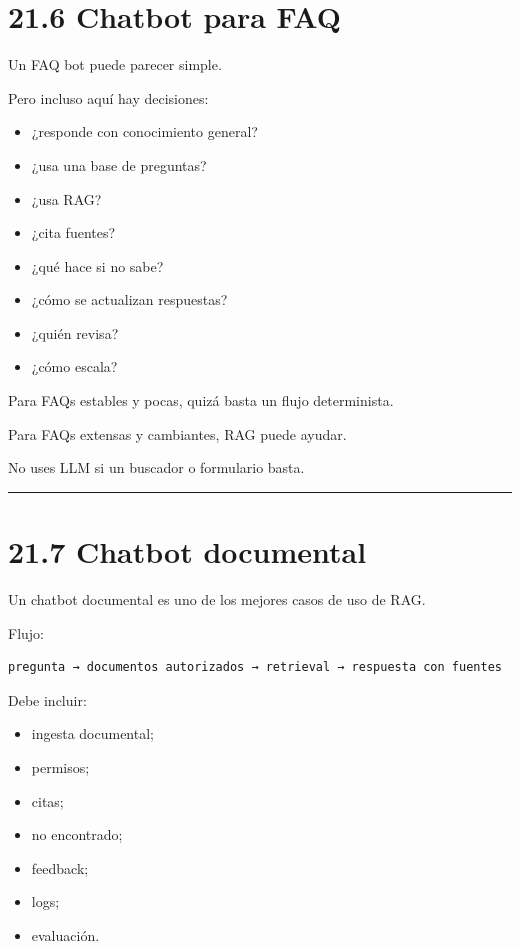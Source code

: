 \section{21.6 Chatbot para FAQ}\label{chatbot-para-faq}

Un FAQ bot puede parecer simple.

Pero incluso aquí hay decisiones:

\begin{itemize}
\tightlist
\item
  ¿responde con conocimiento general?
\item
  ¿usa una base de preguntas?
\item
  ¿usa RAG?
\item
  ¿cita fuentes?
\item
  ¿qué hace si no sabe?
\item
  ¿cómo se actualizan respuestas?
\item
  ¿quién revisa?
\item
  ¿cómo escala?
\end{itemize}

Para FAQs estables y pocas, quizá basta un flujo determinista.

Para FAQs extensas y cambiantes, RAG puede ayudar.

No uses LLM si un buscador o formulario basta.

\begin{center}\rule{0.5\linewidth}{0.5pt}\end{center}

\section{21.7 Chatbot documental}\label{chatbot-documental-2}

Un chatbot documental es uno de los mejores casos de uso de RAG.

Flujo:

\begin{lstlisting}
pregunta → documentos autorizados → retrieval → respuesta con fuentes
\end{lstlisting}

Debe incluir:

\begin{itemize}
\tightlist
\item
  ingesta documental;
\item
  permisos;
\item
  citas;
\item
  no encontrado;
\item
  feedback;
\item
  logs;
\item
  evaluación.
\end{itemize}

